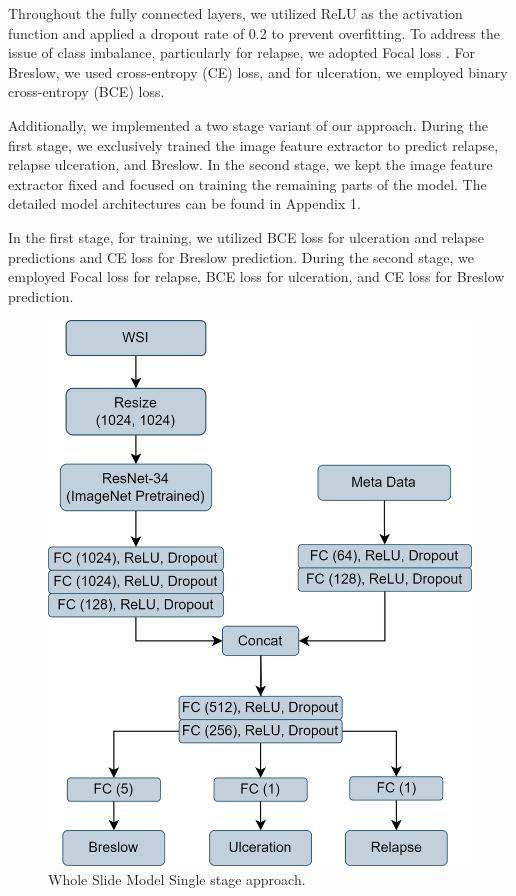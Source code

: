 \documentclass[conference]{IEEEtran}
\begin{document}
Throughout the fully connected layers, we utilized ReLU as the activation function and applied a dropout rate of 0.2 to prevent overfitting. To address the issue of class imbalance, particularly for relapse, we adopted Focal loss \cite{b6}. For Breslow, we used cross-entropy (CE) loss, and for ulceration, we employed binary cross-entropy (BCE) loss. 

Additionally, we implemented a two stage variant of our approach. During the first stage, we exclusively trained the image feature extractor to predict relapse, relapse ulceration, and Breslow. In the second stage, we kept the image feature extractor fixed and focused on training the remaining parts of the model. The detailed model architectures can be found in Appendix 1.

In the first stage, for training, we utilized BCE loss for ulceration and relapse predictions and CE loss for Breslow prediction. During the second stage, we employed Focal loss for relapse, BCE loss for ulceration, and CE loss for Breslow prediction. 
\begin{figure}[h!]
  \centering
    \includegraphics[scale=0.15]{images/page0.png}
  \caption{Whole Slide Model Single stage approach.}
  \label{fig:single_stage_wsi}
\end{figure}
\end{document}
